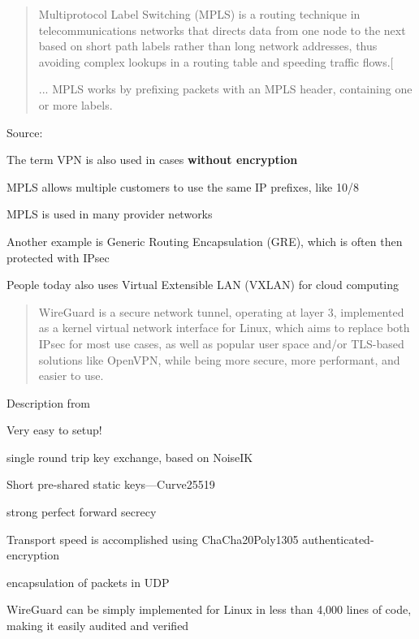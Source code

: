 \documentclass[Screen16to9,17pt]{foils}
\begin{document}

\begin{quote}
Multiprotocol Label Switching (MPLS) is a routing technique in telecommunications networks that directs data from one node to the next based on short path labels rather than long network addresses, thus avoiding complex lookups in a routing table and speeding traffic flows.[

...
MPLS works by prefixing packets with an MPLS header, containing one or more labels.
\end{quote}

Source:\\
{\footnotesize{}}

\begin{list2}
\item The term VPN is also used in cases {\bf without encryption}
\item MPLS allows multiple customers to use the same IP prefixes, like 10/8
\item MPLS is used in many provider networks
\item Another example is Generic Routing Encapsulation (GRE), which is often then protected with IPsec
\item People today also uses Virtual Extensible LAN (VXLAN) for cloud computing
\end{list2}




\begin{quote}\small
WireGuard is a secure network tunnel, operating at layer 3, implemented as a kernel virtual network interface for Linux, which aims to replace both IPsec for most use cases, as well as popular user space and/or TLS-based solutions like OpenVPN, while being more secure, more performant, and easier to use.
\end{quote}

Description from 

\begin{list2}
\item Very easy to setup!
\item single round trip key exchange, based on NoiseIK
\item Short pre-shared static keys—Curve25519
\item strong perfect forward secrecy
\item Transport
speed is accomplished using ChaCha20Poly1305 authenticated-encryption
\item encapsulation of packets in UDP
\item WireGuard can be
simply implemented for Linux in less than 4,000 lines of code, making it easily audited and verified
\end{list2}
\end{document}

